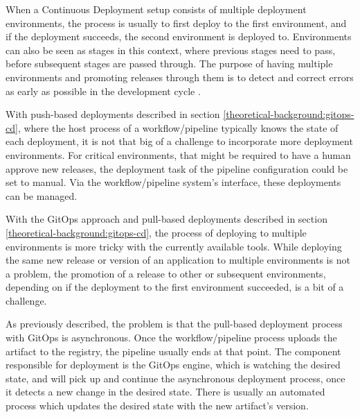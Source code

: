 
When a Continuous Deployment setup consists of multiple deployment environments,
the process is usually to first deploy to the first environment,
and if the deployment succeeds, the second environment is deployed to.
Environments can also be seen as stages in this context,
where previous stages need to pass, before subsequent stages are passed through.
The purpose of having multiple environments and promoting releases through them
is to detect and correct errors as early as possible in the development cycle
\autocite{gitopsAndKubernetes2021continuous}.

With push-based deployments described in section \ref{theoretical-background:gitops-cd},
where the host process of a workflow/pipeline typically knows the state of each deployment,
it is not that big of a challenge to incorporate more deployment environments.
For critical environments, that might be required to have a human approve new releases,
the deployment task of the pipeline configuration could be set to manual.
Via the workflow/pipeline system's interface, these deployments can be managed.

With the GitOps approach and pull-based deployments described in section \ref{theoretical-background:gitops-cd},
the process of deploying to multiple environments is more tricky with the currently available tools.
While deploying the same new release or version of an application to multiple environments is not a problem,
the promotion of a release to other or subsequent environments, depending on if the deployment to the first environment succeeded,
is a bit of a challenge.

As previously described, the problem is that the pull-based deployment process with GitOps is asynchronous.
Once the workflow/pipeline process uploads the artifact to the registry, the pipeline usually ends at that point.
The component responsible for deployment is the GitOps engine, which is watching the desired state,
and will pick up and continue the asynchronous deployment process, once it detects a new change in the desired state.
There is usually an automated process which updates the desired state with the new artifact's version.



